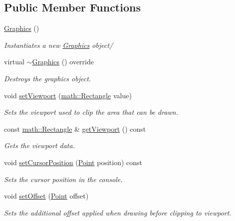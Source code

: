 \subsection*{Public Member Functions}
\begin{DoxyCompactItemize}
\item 
\mbox{\hyperlink{class_graphics_af2e8fe67fd31ec263c843a6e28b29d3c}{Graphics}} ()
\begin{DoxyCompactList}\small\item\em Instantiates a new \mbox{\hyperlink{class_graphics}{Graphics}} object/ \end{DoxyCompactList}\item 
virtual \mbox{\hyperlink{class_graphics_acfd935938e3e757e2952af5fec13115a}{$\sim$\+Graphics}} () override
\begin{DoxyCompactList}\small\item\em Destroys the graphics object. \end{DoxyCompactList}\item 
void \mbox{\hyperlink{class_graphics_a9b7d5d06b00c13570dc912e7ce72763c}{set\+Viewport}} (\mbox{\hyperlink{structmath_1_1_rectangle}{math\+::\+Rectangle}} value)
\begin{DoxyCompactList}\small\item\em Sets the viewport used to clip the area that can be drawn. \end{DoxyCompactList}\item 
const \mbox{\hyperlink{structmath_1_1_rectangle}{math\+::\+Rectangle}} \& \mbox{\hyperlink{class_graphics_afaf7971888fc95f50fdde81ee4fb0fa7}{get\+Viewport}} () const
\begin{DoxyCompactList}\small\item\em Gets the viewport data. \end{DoxyCompactList}\item 
void \mbox{\hyperlink{class_graphics_a42644ce7960c02a4a541fbb121fa4d95}{set\+Cursor\+Position}} (\mbox{\hyperlink{struct_point}{Point}} position) const
\begin{DoxyCompactList}\small\item\em Sets the cursor position in the console. \end{DoxyCompactList}\item 
void \mbox{\hyperlink{class_graphics_aa2719845f973c66d61a6ecf9a8bddaf4}{set\+Offset}} (\mbox{\hyperlink{struct_point}{Point}} offset)
\begin{DoxyCompactList}\small\item\em Sets the additional offset applied when drawing before clipping to viewport. \end{DoxyCompactList}\item 

\end{DoxyCompactItemize}
